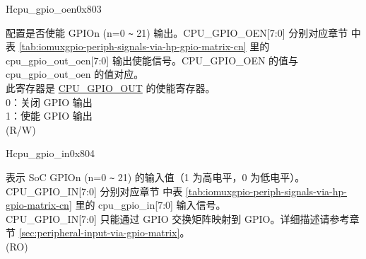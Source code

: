 \begin{register}{H}{cpu\_gpio\_oen}{0x803}\label{regdesc:GPIO_OEN}
%
%
%
%
%
%
%
%
%
\regnewline%
\begin{regdesc}\begin{reglist}
\label{fielddesc:GPIO_OEN}\item [CPU\_GPIO\_OEN] 配置是否使能 GPIOn (n=0 \verb+~+ 21) 输出。CPU\_GPIO\_OEN[7:0] 分别对应章节 \textit{} 中表 \ref{tab:iomuxgpio-periph-signals-via-hp-gpio-matrix-cn} 里的 cpu\_gpio\_out\_oen[7:0] 输出使能信号。CPU\_GPIO\_OEN 的值与 cpu\_gpio\_out\_oen 的值对应。\\
此寄存器是 \hyperref[fielddesc:GPIO_OUT]{CPU\_GPIO\_OUT} 的使能寄存器。\\
0：关闭 GPIO 输出\\
1：使能 GPIO 输出\\
(R/W)
\end{reglist}\end{regdesc}
\end{register}

\begin{register}{H}{cpu\_gpio\_in}{0x804}\label{regdesc:GPIO_IN}
%
%
%
%
%
%
%
%
%
\regnewline%
\begin{regdesc}\begin{reglist}
\label{fielddesc:GPIO_IN}\item [CPU\_GPIO\_IN] 表示 SoC GPIOn (n=0 \verb+~+ 21) 的输入值（1 为高电平，0 为低电平）。\\
CPU\_GPIO\_IN[7:0] 分别对应章节 \textit{} 中表 \ref{tab:iomuxgpio-periph-signals-via-hp-gpio-matrix-cn} 里的 cpu\_gpio\_in[7:0] 输入信号。\\
CPU\_GPIO\_IN[7:0] 只能通过 GPIO 交换矩阵映射到 GPIO。详细描述请参考章节 \ref{sec:peripheral-input-via-gpio-matrix}。\\
(RO)
\end{reglist}\end{regdesc}
\end{register}

